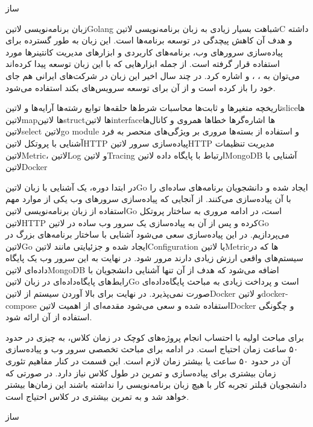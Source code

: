 \documentclass[]{description}
\begin{document}
‌ساز


زبان برنامه‌نویسی ‌لاتین{Golang} شباهت بسیار زیادی به زبان برنامه‌نویسی ‌لاتین{C} داشته و هدف آن کاهش پیچدگی در توسعه برنامه‌ها است.
این زبان به طور گسترده برای پیاده‌سازی سرور‌های وب، برنامه‌های کاربردی و ابزارهای مدیریت کانتینرها مورد استفاده قرار گرفته است.
از جمله ابزارهایی که با این زبان توسعه پیدا کرده‌اند می‌توان به
،
،
و  اشاره کرد.
در چند سال اخیر این زبان در شرکت‌های ایرانی هم جای خود را باز کرده است و از آن برای توسعه سرویس‌های بکند استفاده می‌شود.


 تاریخچه
 متغیرها و ثابت‌ها
 محاسبات
 شرط‌ها
 حلقه‌ها
 توابع
 رشته‌ها
 آرایه‌ها و ‌لاتین{slice}ها
 ‌لاتین{map}ها
 ‌لاتین{struct}ها
 ‌لاتین{interface}ها
 اشاره‌گرها
 خطاها
 همروی و کانال‌ها
 ‌لاتین{select}
 ‌لاتین{go module} و استفاده از بسته‌ها
 مروری بر ویژگی‌های منحصر به فرد
 آشنایی با پروتکل ‌لاتین{HTTP}
 پیاده‌سازی سرور ‌لاتین{HTTP}
 مدیریت تنظیمات
 ‌لاتین{Metric}، ‌لاتین{Log} و ‌لاتین{Tracing}
 ارتباط با پایگاه داده ‌لاتین{MongoDB}
 آشنایی با ‌لاتین{Docker}

در ابتدا دوره، یک آشنایی با زبان ‌لاتین{Go} ایجاد شده و دانشجویان برنامه‌های ساده‌ای را با آن پیاده‌سازی می‌کنند. از آنجایی که پیاده‌سازی سرورهای وب
یکی از موارد مهم استفاده از زبان برنامه‌نویسی ‌لاتین{Go} است، در ادامه مروری به ساختار پروتکل ‌لاتین{HTTP} کرده و پس از آن به پیاده‌سازی یک سرور وب ساده
در ‌لاتین{Go} می‌پردازیم. در این پیاده‌سازی سعی می‌شود آشنایی با ساختار برنامه‌های بزرگ در ‌لاتین{Go} ایجاد شده و جزئیایتی مانند ‌لاتین{Configuration} یا ‌لاتین{Metric}ها
که در سیستم‌های واقعی ارزش زیادی دارند مرور شود. در نهایت به این سرور وب یک پایگاه داده‌ای ‌لاتین{MongoDB} اضافه می‌شود که هدف از آن تنها آشنایی دانشجویان با رابط‌های پایگاه‌داده‌ای در زبان ‌لاتین{Go}
است و پرداخت زیادی به مباحث پایگاه‌داده‌ای صورت نمی‌پذیرد.
در نهایت برای بالا آوردن سیستم از ‌لاتین{Docker} و ‌لاتین{docker-compose} استفاده شده و سعی می‌شود مقدمه‌ای از اهمیت ‌لاتین{Docker} و چگونگی استفاده از آن ارائه شود.


برای مباحث اولیه با احتساب انجام پروژه‌های کوچک در زمان کلاس، به چیزی در حدود ۵۰ ساعت زمان احتیاج است.
در ادامه برای مباحث تخصصی سرور وب و پیاده‌سازی آن در حدود ۵۰ ساعت یا بیشتر زمان لازم است. این قسمت در کنار مفاهیم تئوری
زمان بیشتری برای پیاده‌سازی و تمرین در طول کلاس نیاز دارد.
در صورتی که دانشجویان قبلتر تجربه کار با هیچ زبان برنامه‌نویسی را نداشته باشند این زمان‌ها بیشتر خواهد شد و به تمرین بیشتری در کلاس احتیاج است.

‌ساز
\end{document}
